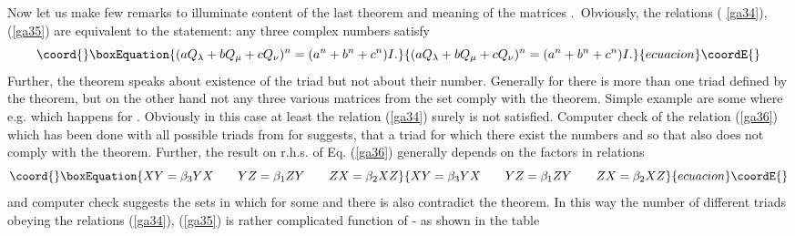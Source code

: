 \documentclass[a4paper,a4paper]{article}
\begin{document}
Now let us make few remarks to illuminate content of the last theorem and
meaning of the matrices \coordHE{}.\textit{\ }Obviously, the relations (%
\ref{ga34}), (\ref{ga35}) are equivalent to the statement: any three complex
numbers \coordHE{} satisfy 
\begin{equation}\coord{}\boxEquation{
(aQ_{\lambda }+bQ_{\mu }+cQ_{\nu })^{n}=(a^{n}+b^{n}+c^{n})I.  \label{ga37}
}{
(aQ_{\lambda }+bQ_{\mu }+cQ_{\nu })^{n}=(a^{n}+b^{n}+c^{n})I.  }{ecuacion}\coordE{}\end{equation}%
Further, the theorem speaks about existence of the triad but not about their
number. Generally for \coordHE{} there is more than one triad defined by the
theorem, but on the other hand not any three various matrices from the set \coordHE{} comply with the theorem. Simple example are some \coordHE{} where e.g. \coordHE{} which happens for \coordHE{}. Obviously in this case at
least the relation (\ref{ga34}) surely is not satisfied. Computer check of
the relation (\ref{ga36}) which has been done with all possible triads from \coordHE{} for \coordHE{} suggests, that a triad \coordHE{} for which there
exist the numbers \coordHE{} and \coordHE{} so that \coordHE{} also does not comply with the theorem. Further, the
result on r.h.s. of Eq. (\ref{ga36}) generally depends on the factors \coordHE{} in relations 
\begin{equation}\coord{}\boxEquation{
XY=\beta _{3}YX\qquad YZ=\beta _{1}ZY\qquad ZX=\beta _{2}XZ  \label{gaa37}
}{
XY=\beta _{3}YX\qquad YZ=\beta _{1}ZY\qquad ZX=\beta _{2}XZ  }{ecuacion}\coordE{}\end{equation}%
and computer check suggests the sets in which for some \coordHE{} and \coordHE{}
there is \coordHE{} also contradict the theorem. In this way the
number of different triads obeying the relations (\ref{ga34}), (\ref{ga35})
is rather complicated function of \coordHE{} - as shown in the table 
\end{document}
